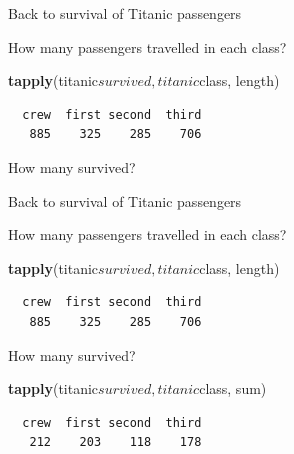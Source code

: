 \documentclass[10pt,ignorenonframetext,]{beamer}
\newenvironment{Shaded}{\begin{snugshade}}{\end{snugshade}}
\newcommand{\KeywordTok}[1]{\textcolor[rgb]{0.13,0.29,0.53}{\textbf{{#1}}}}
\newcommand{\NormalTok}[1]{{#1}}
\begin{document}
\begin{frame}[fragile]{Back to survival of Titanic passengers}

How many passengers travelled in each class?

\begin{Shaded}
\begin{Highlighting}[]
\KeywordTok{tapply}\NormalTok{(titanic$survived, titanic$class, length)}
\end{Highlighting}
\end{Shaded}

\begin{verbatim}
  crew  first second  third 
   885    325    285    706 
\end{verbatim}

How many survived?

\end{frame}

\begin{frame}[fragile]{Back to survival of Titanic passengers}

How many passengers travelled in each class?

\begin{Shaded}
\begin{Highlighting}[]
\KeywordTok{tapply}\NormalTok{(titanic$survived, titanic$class, length)}
\end{Highlighting}
\end{Shaded}

\begin{verbatim}
  crew  first second  third 
   885    325    285    706 
\end{verbatim}

How many survived?

\begin{Shaded}
\begin{Highlighting}[]
\KeywordTok{tapply}\NormalTok{(titanic$survived, titanic$class, sum)}
\end{Highlighting}
\end{Shaded}

\begin{verbatim}
  crew  first second  third 
   212    203    118    178 
\end{verbatim}

\end{frame}
\end{document}
